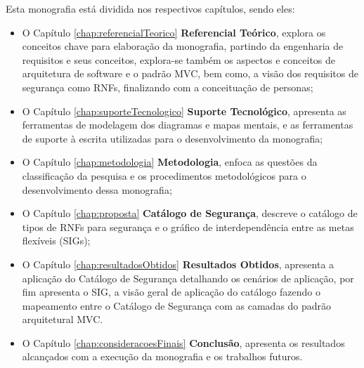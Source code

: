 Esta monografia está dividida nos respectivos capítulos, sendo eles: 
\begin{itemize}
	\item O Capítulo \ref{chap:referencialTeorico} \textbf{Referencial Teórico}, explora os conceitos chave para elaboração da monografia, partindo da engenharia de requisitos e seus conceitos, explora-se também os aspectos e conceitos de arquitetura de software e o padrão MVC, bem como, a visão dos requisitos de segurança como RNFs, finalizando com a conceituação de personas;
	
	\item  O Capítulo \ref{chap:suporteTecnologico} \textbf{Suporte Tecnológico}, apresenta as ferramentas de modelagem dos diagramas e mapas mentais, e as ferramentas de suporte à escrita utilizadas para o desenvolvimento da monografia;
	
	\item O Capítulo \ref{chap:metodologia} \textbf{Metodologia}, enfoca as questões da classificação da pesquisa e os procedimentos metodológicos para o desenvolvimento dessa monografia;
	
	\item O Capítulo \ref{chap:proposta} \textbf{Catálogo de Segurança}, descreve o catálogo de tipos de RNFs para segurança e o gráfico de interdependência entre as metas flexíveis (SIGs);
	
	\item  O Capítulo  \ref{chap:resultadosObtidos} \textbf{Resultados Obtidos}, apresenta a aplicação do Catálogo de Segurança detalhando os cenários de aplicação, por fim apresenta o SIG, a visão geral de aplicação do catálogo fazendo o mapeamento entre o Catálogo de Segurança com as camadas do padrão arquitetural MVC. 
	
	\item  O Capítulo \ref{chap:consideracoesFinais} \textbf{Conclusão}, apresenta os resultados alcançados com a execução da monografia e os trabalhos futuros. 
\end{itemize}

